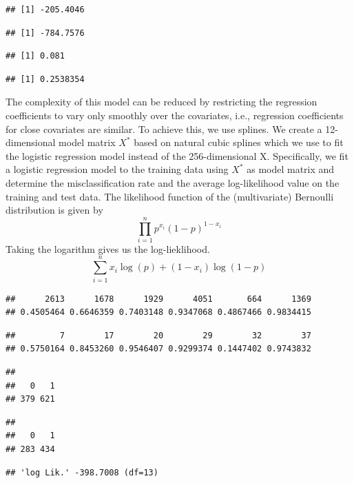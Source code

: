 \documentclass[
]{article}
\begin{document}
\begin{verbatim}
## [1] -205.4046
\end{verbatim}

\begin{verbatim}
## [1] -784.7576
\end{verbatim}

\begin{verbatim}
## [1] 0.081
\end{verbatim}

\begin{verbatim}
## [1] 0.2538354
\end{verbatim}

The complexity of this model can be reduced by restricting the
regression coefficients to vary only smoothly over the covariates, i.e.,
regression coefficients for close covariates are similar. To achieve
this, we use splines. We create a 12-dimensional model matrix \(X^*\)
based on natural cubic splines which we use to fit the logistic
regression model instead of the 256-dimensional X. Specifically, we fit
a logistic regression model to the training data using \(X^*\) as model
matrix and determine the misclassification rate and the average
log-likelihood value on the training and test data. The likelihood
function of the (multivariate) Bernoulli distribution is given by
\[\prod_{i=1}^n p^{x_i}(1-p)^{1-x_i}\] Taking the logarithm gives us the
log-lieklihood. \[ \sum_{i=1}^n x_i \log(p)+(1-x_i)\log(1-p) \]

\begin{verbatim}
##      2613      1678      1929      4051       664      1369 
## 0.4505464 0.6646359 0.7403148 0.9347068 0.4867466 0.9834415
\end{verbatim}

\begin{verbatim}
##         7        17        20        29        32        37 
## 0.5750164 0.8453260 0.9546407 0.9299374 0.1447402 0.9743832
\end{verbatim}

\begin{verbatim}
## 
##   0   1 
## 379 621
\end{verbatim}

\begin{verbatim}
## 
##   0   1 
## 283 434
\end{verbatim}

\begin{verbatim}
## 'log Lik.' -398.7008 (df=13)
\end{verbatim}
\end{document}
